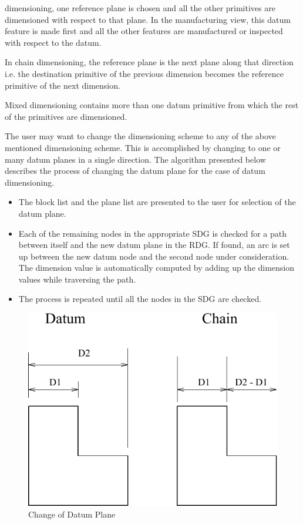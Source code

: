 \begin{enumerate}
    dimensioning, one reference plane is chosen and all the
    other primitives are dimensioned with respect to that plane.
    In the manufacturing view, this datum feature is made first 
    and all the other features are manufactured or inspected with respect 
	to the datum.

    In chain dimensioning, the reference plane is the next plane along that 
	direction i.e. the destination primitive of the previous dimension becomes 
	the reference primitive of the next dimension.

    Mixed dimensioning contains more than one datum primitive from which the 
	rest of the primitives are dimensioned.

	The user may want to change the dimensioning scheme to any of the above
	mentioned dimensioning scheme. This is accomplished by changing to
	one or many datum planes in a single direction. The algorithm
	presented below describes the process of changing the datum plane for
	the case of datum dimensioning.

		\begin{itemize}
		\item
		The block list and the plane list are presented to the user for 
		selection of the datum plane.
		\item
		Each of the remaining nodes in the appropriate SDG is checked for a 
		path between
		itself and the new datum plane in the RDG. If found, an arc is set up
		between the new datum node and the second node under consideration.
		The dimension value is automatically computed by adding up the
		dimension values while traversing the path.

		\item
		The process is repeated until all the nodes in the SDG are checked.
		\end{itemize}

	        \begin{figure}[htbp]
	            \hspace{4cm}
	            \includegraphics[scale=1.2]{CHGDAT.pdf}
	            \caption{Change of Datum Plane}
	            \label{chgdat}
	        \end{figure}


\end{enumerate}
